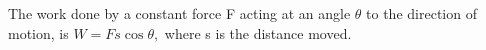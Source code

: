                  The work done by a constant force F acting at an angle $ \theta $
to the direction of motion, is $ W = Fs \cos \theta , $ where
s is the distance moved.
		